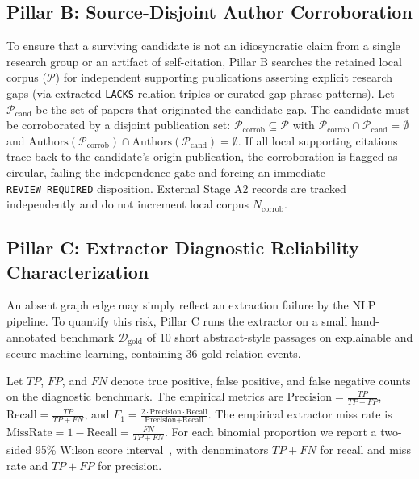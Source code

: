 \documentclass[runningheads]{llncs}
\begin{document}
\subsection{Pillar B: Source-Disjoint Author Corroboration}
To ensure that a surviving candidate is not an idiosyncratic claim from a single research group or an artifact of self-citation, Pillar B searches the retained local corpus ($\mathcal{P}$) for independent supporting publications asserting explicit research gaps (via extracted \texttt{LACKS} relation triples or curated gap phrase patterns). Let $\mathcal{P}_{\text{cand}}$ be the set of papers that originated the candidate gap. The candidate must be corroborated by a disjoint publication set: $\mathcal{P}_{\text{corrob}} \subseteq \mathcal{P}$ with $\mathcal{P}_{\text{corrob}} \cap \mathcal{P}_{\text{cand}} = \emptyset$ and $\text{Authors}(\mathcal{P}_{\text{corrob}}) \cap \text{Authors}(\mathcal{P}_{\text{cand}}) = \emptyset$. If all local supporting citations trace back to the candidate's origin publication, the corroboration is flagged as circular, failing the independence gate and forcing an immediate \texttt{REVIEW\_REQUIRED} disposition. External Stage A2 records are tracked independently and do not increment local corpus $N_{\text{corrob}}$.

\subsection{Pillar C: Extractor Diagnostic Reliability Characterization}
\label{sec:pillar_c}

An absent graph edge may simply reflect an extraction failure by the NLP pipeline. To quantify this risk, Pillar C runs the extractor on a small hand-annotated benchmark $\mathcal{D}_{\text{gold}}$ of 10 short abstract-style passages on explainable and secure machine learning, containing 36 gold relation events.

Let $TP$, $FP$, and $FN$ denote true positive, false positive, and false negative counts on the diagnostic benchmark. The empirical metrics are $\text{Precision} = \frac{TP}{TP + FP}$, $\text{Recall} = \frac{TP}{TP + FN}$, and $F_1 = \frac{2 \cdot \text{Precision} \cdot \text{Recall}}{\text{Precision} + \text{Recall}}$. The empirical extractor miss rate is $\text{MissRate} = 1 - \text{Recall} = \frac{FN}{TP + FN}$. For each binomial proportion we report a two-sided 95\% Wilson score interval~\cite{wilson1927}, with denominators $TP + FN$ for recall and miss rate and $TP + FP$ for precision.
\end{document}
